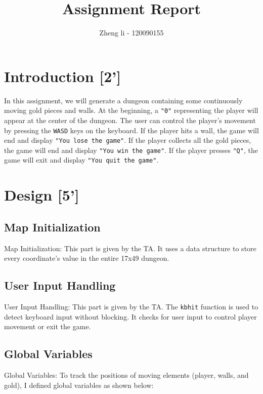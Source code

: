 \documentclass{article}
\title{Assignment Report}
\author{Zheng li - 120090155}
\begin{document}
\maketitle



\section{Introduction [2']}

In this assignment, we will generate a dungeon containing some continuously moving gold pieces and walls. 
At the beginning, a \texttt{"0"} representing the player will appear at the center of the dungeon. The user can control the player's movement by pressing the \texttt{WASD} keys on the keyboard. 
If the player hits a wall, the game will end and display \texttt{"You lose the game"}. If the player collects all the gold pieces, the game will end and display \texttt{"You win the game"}. 
If the player presses \texttt{"Q"}, the game will exit and display \texttt{"You quit the game"}.


\section{Design [5']}
\subsection{Map Initialization}
Map Initialization: This part is given by the TA. It uses a data structure to store every coordinate's value in the entire 17x49 dungeon.

\subsection{User Input Handling}
User Input Handling: This part is given by the TA. The \texttt{kbhit} function is used to detect keyboard input without blocking. It checks for user input to control player movement or exit the game.

\subsection{Global Variables}
Global Variables: To track the positions of moving elements (player, walls, and gold), I defined global variables as shown below:
\end{document}
